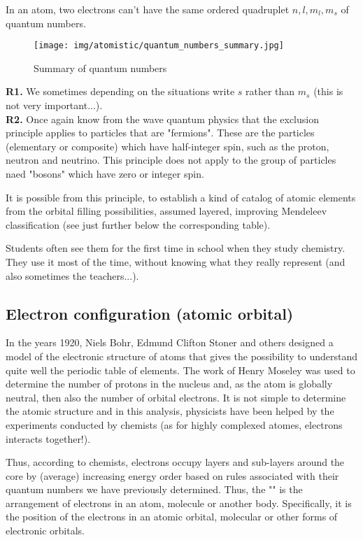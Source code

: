 	In an atom, two electrons can't have the same ordered quadruplet $n,l,m_l,m_s$ of quantum numbers.
	\begin{figure}[H]
		\centering
		\texttt{[image: img/atomistic/quantum\_numbers\_summary.jpg]}
		\caption{Summary of quantum numbers}
	\end{figure}
	\begin{tcolorbox}[title=Remarks,colframe=black,arc=10pt]
	\textbf{R1.} We sometimes depending on the situations write $s$ rather than $m_s$ (this is not very important...).\\
	
	\textbf{R2.} Once again know from the wave quantum physics that the exclusion principle applies to particles that are "fermions". These are the particles (elementary or composite) which have half-integer spin, such as the proton, neutron and neutrino. This principle does not apply to the group of particles naed "bosons" which have zero or integer spin.
	\end{tcolorbox}
	It is possible from this principle, to establish a kind of catalog of atomic elements from the orbital filling possibilities, assumed layered, improving Mendeleev classification (see just further below the corresponding table).

	Students often see them for the first time in school when they study chemistry. They use it most of the time, without knowing what they really represent (and also sometimes the teachers...).
	
	\subsection{Electron configuration (atomic orbital)}\label{electron configuration}
	In the years 1920, Niels Bohr, Edmund Clifton Stoner and others designed a model of the electronic structure of atoms that gives the possibility to understand quite well the periodic table of elements. The work of Henry Moseley was used to determine the number of protons in the nucleus and, as the atom is globally neutral, then also the number of orbital electrons. It is not simple to determine the atomic structure and in this analysis, physicists have been helped by the experiments conducted by chemists (as for highly complexed atomes, electrons interacts together!).

	Thus, according to chemists, electrons occupy layers and sub-layers around the core by (average) increasing energy order based on rules associated with their quantum numbers we have previously determined. Thus, the "" is the arrangement of electrons in an atom, molecule or another body. Specifically, it is the position of the electrons in an atomic orbital, molecular or other forms of electronic orbitals.
	
